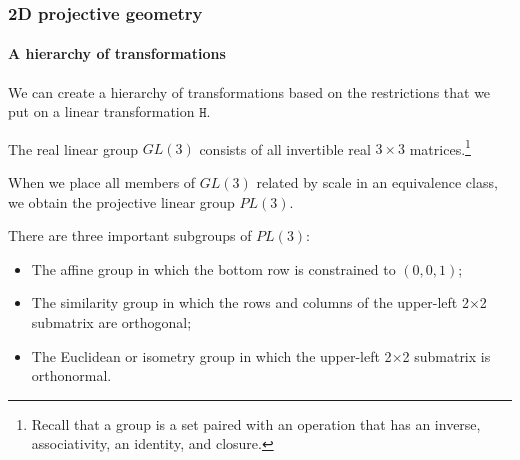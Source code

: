 \documentclass[aspectratio=169]{beamer}
\newcommand{\mat}[1]{\mathtt{#1}}
\begin{document}
\begin{frame}
\frametitle{2D projective geometry}
\framesubtitle{A hierarchy of transformations}

We can create a \alert{hierarchy of transformations} based on the
restrictions that we put on a linear transformation $\mat{H}$.

\medskip

The \alert{real linear group} $GL(3)$ consists of all invertible real
$3\times 3$ matrices.\footnote{Recall that a \alert{group} is a set
  paired with an operation that has an inverse, associativity, an
  identity, and closure.}

\medskip

When we place all members of $GL(3)$ related by
scale in an equivalence class, we obtain the \alert{projective linear
group} $PL(3)$.

\medskip

There are three important subgroups of $PL(3)$:
\begin{itemize}
\item The \alert{affine} group in which the bottom row is constrained to
  $(0,0,1)$;
\item The \alert{similarity} group in which the rows and columns
  of the upper-left 2$\times$2 submatrix are orthogonal;
\item The \alert{Euclidean} or \alert{isometry} group in which the
  upper-left 2$\times$2 submatrix is orthonormal.
\end{itemize}

\end{frame}
\end{document}
